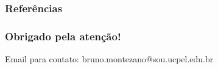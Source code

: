 \documentclass{beamer}
\begin{document}
\begin{frame}[allowframebreaks]
\frametitle{Referências}

\printbibliography

\end{frame}

\begin{frame}
\frametitle{Obrigado pela atenção!}


    \begin{block}{Email para contato:}
        bruno.montezano@sou.ucpel.edu.br
    \end{block}

\end{frame}
\end{document}
